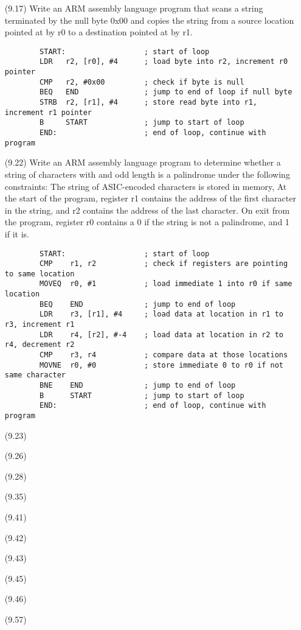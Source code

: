 \documentclass[letterpaper,10pt,titlepage]{article}
\begin{document}
\begin{enumerate}
	\item[(9.17)] Write an ARM assembly language program that scans a string
		terminated by the null byte 0x00 and copies the string from a source
		location pointed at by r0 to a destination pointed at by r1.
		\\
		\begin{verbatim}
		START:                  ; start of loop
		LDR   r2, [r0], #4      ; load byte into r2, increment r0 pointer
		CMP   r2, #0x00         ; check if byte is null
		BEQ   END               ; jump to end of loop if null byte
		STRB  r2, [r1], #4      ; store read byte into r1, increment r1 pointer
		B     START             ; jump to start of loop
		END:                    ; end of loop, continue with program
		\end{verbatim}

	\item[(9.22)] Write an ARM assembly language program to determine whether a string
		of characters with and odd length is a palindrome under the following
		constraints: The string of ASIC-encoded characters is stored in memory, At
		the start of the program, register r1 contains the address of the first
		character in the string, and r2 contains the address of the last
		character. On exit from the program, register r0 contains a 0 if the
		string is not a palindrome, and 1 if it is.
		\\
		\begin{verbatim}
		START:                  ; start of loop
		CMP    r1, r2           ; check if registers are pointing to same location
		MOVEQ  r0, #1           ; load immediate 1 into r0 if same location
		BEQ    END              ; jump to end of loop
		LDR    r3, [r1], #4     ; load data at location in r1 to r3, increment r1
		LDR    r4, [r2], #-4    ; load data at location in r2 to r4, decrement r2
		CMP    r3, r4           ; compare data at those locations
		MOVNE  r0, #0           ; store immediate 0 to r0 if not same character
		BNE    END              ; jump to end of loop
		B      START            ; jump to start of loop
		END:                    ; end of loop, continue with program
		\end{verbatim}
	\item[(9.23)]
	\item[(9.26)]
	\item[(9.28)]
	\item[(9.35)]
	\item[(9.41)]
	\item[(9.42)]
	\item[(9.43)]
	\item[(9.45)]
	\item[(9.46)]
	\item[(9.57)]

\end{enumerate}
\end{document}
